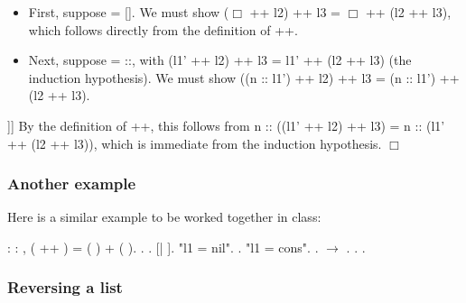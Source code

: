 \documentclass[12pt]{report}
\begin{document}
\begin{itemize}
\item  First, suppose  = [].  We must show
       (\ensuremath{\Box} ++ l2) ++ l3 = \ensuremath{\Box} ++ (l2 ++ l3),
     which follows directly from the definition of ++.



\item  Next, suppose  = ::, with
       (l1' ++ l2) ++ l3 = l1' ++ (l2 ++ l3)
     (the induction hypothesis). We must show
       ((n :: l1') ++ l2) ++ l3 = (n :: l1') ++ (l2 ++ l3).

\end{itemize}
]]  
     By the definition of ++, this follows from
       n :: ((l1' ++ l2) ++ l3) = n :: (l1' ++ (l2 ++ l3)),
     which is immediate from the induction hypothesis.  \ensuremath{\Box}


\subsubsection{Another example}



  Here is a similar example to be worked together in class: \begin{coqdoccode}
\coqdocemptyline
\coqdocnoindent
{}  : \coqdockw{\ensuremath{\forall}}   : , \coqdoceol
\coqdocindent{1.00em}
 ( ++ ) = ( ) + ( ).\coqdoceol
\coqdocnoindent
{}.\coqdoceol
\coqdocindent{1.00em}
  .    [|  ].\coqdoceol
\coqdocindent{1.00em}
 "l1 = nil".\coqdoceol
\coqdocindent{2.00em}
.\coqdoceol
\coqdocindent{1.00em}
 "l1 = cons".\coqdoceol
\coqdocindent{2.00em}
.  \ensuremath{\rightarrow} . . .\coqdoceol
\coqdocemptyline
\end{coqdoccode}
\subsubsection{Reversing a list}
\end{document}
